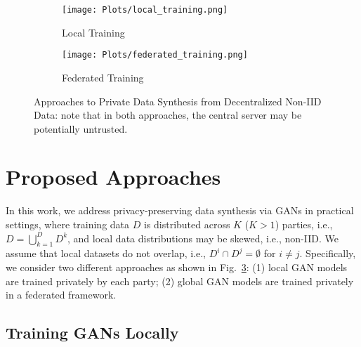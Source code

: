 \documentclass[conference]{IEEEtran}
\begin{document}
\begin{figure}
	\centering
	
		\begin{subfigure}[b]{0.43\linewidth} 
		\centering
		\texttt{[image: Plots/local\_training.png]}
		\caption[]%
		{{\scriptsize Local Training }}
 	\label{fig:local_level}
 		\end{subfigure}
	\hfill
	\begin{subfigure}[b]{0.42\linewidth} 
		\centering
		\texttt{[image: Plots/federated\_training.png]}
		\caption[]%
		{{\scriptsize Federated Training }}
 	\label{fig:server_level}
	\end{subfigure}
	\caption{\small Approaches to Private Data Synthesis from Decentralized Non-IID Data: note that in both approaches, the central server may be potentially untrusted.}
	\label{fig:local_levelVSserver_level}
\end{figure}


\section{Proposed Approaches}
In this work, we address privacy-preserving data synthesis via GANs in practical settings, where training data $D$ is distributed across $K$ ($K>1$) parties, i.e., $D = \bigcup_{k=1}^{D}D^{k}$,  and local data distributions may be skewed, i.e., non-IID.  We assume that local datasets do not overlap, i.e., $D^i \cap D^j = \emptyset$ for $i \ne j$.  Specifically, we consider two different approaches as shown in Fig.~\ref{fig:local_levelVSserver_level}: (1) local GAN models are trained privately by each party; (2) global GAN models are trained privately in a federated framework. 


\subsection{Training GANs Locally}
\end{document}
